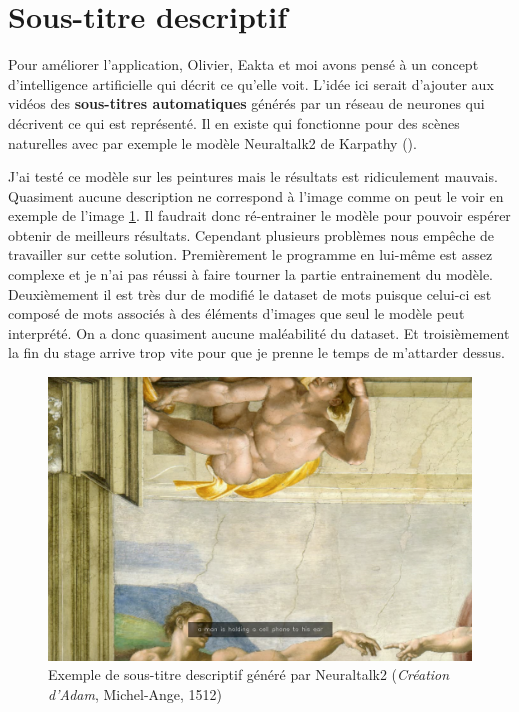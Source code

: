 \section{Sous-titre descriptif}

\par
Pour améliorer l'application, Olivier, Eakta et moi avons pensé à un concept d'intelligence artificielle qui décrit ce qu'elle voit. L'idée ici serait d'ajouter aux vidéos des \textbf{sous-titres automatiques} générés par un réseau de neurones qui décrivent ce qui est représenté. Il en existe qui fonctionne pour des scènes naturelles avec par exemple le modèle Neuraltalk2 de Karpathy \cite{neuraltalk2} ().

\par
J'ai testé ce modèle sur les peintures mais le résultats est ridiculement mauvais. Quasiment aucune description ne correspond à l'image comme on peut le voir en exemple de l'image \ref{fig:ex_neuraltalk}. Il faudrait donc ré-entrainer le modèle pour pouvoir espérer obtenir de meilleurs résultats. Cependant plusieurs problèmes nous empêche de travailler sur cette solution. Premièrement le programme en lui-même est assez complexe et je n'ai pas réussi à faire tourner la partie entrainement du modèle. Deuxièmement il est très dur de modifié le dataset de mots puisque celui-ci est composé de mots associés à des éléments d'images que seul le modèle peut interprété. On a donc quasiment aucune maléabilité du dataset. Et troisièmement la fin du stage arrive trop vite pour que je prenne le temps de m'attarder dessus.

\begin{figure}[ht]
  \centering
  \includegraphics[width=0.7\linewidth]{datas/exemple_sous_titre.png}
  \caption{Exemple de sous-titre descriptif généré par Neuraltalk2 (\emph{Création d'Adam}, Michel-Ange, 1512)}
  \label{fig:ex_neuraltalk}
\end{figure}

